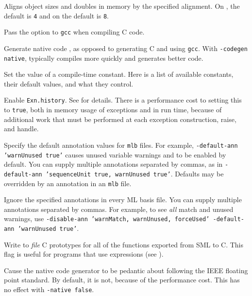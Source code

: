 \begin{description}

Aligns object sizes and doubles in memory by the specified alignment.
On {\intel}, the default is {\tt 4} and on {\sparc} the default is
{\tt 8}.

Pass the option to {\tt gcc} when compiling C code.

Generate native code , as opposed to generating C and using {\tt gcc}.
With {\tt -codegen native}, {\mlton} typically compiles more quickly and
generates better code.

Set the value of a compile-time constant.  Here is a list of available
constants, their default values, and what they control.

\vspace{0em} %
\begin{description}

Enable {\tt Exn.history}.  See  for details.  There is a
performance cost to setting this to {\tt true}, both in memory usage
of exceptions and in run time, because of additional work that must be
performed at each exception construction, raise, and handle.

\end{description}

Specify the default annotation values for {\tt mlb} files.  For
example, {\tt -default-ann 'warnUnused true'} causes unused variable
warnings and to be enabled by default.  You can supply multiple
annotations separated by commas, as in {\tt -default-ann 'sequenceUnit
true, warnUnused true'}.  Defaults may be overridden by an annotation
in an {\tt mlb} file.

Ignore the specified annotations in every ML basis file.  You can
supply multiple annotations separated by commas.  For example, to see
{\em all} match and unused warnings, use {\tt -disable-ann 'warnMatch,
warnUnused, forceUsed' -default-ann 'warnUnused true'}.

Write to {\it file} C prototypes for all of the functions exported
from SML to C.  This flag is useful for programs that use {\export}
expressions (see ).

Cause the native code generator to be pedantic about following the
IEEE floating point standard.  By default, it is not, because of the
performance cost.  This has no effect with {\tt -native false}.


\end{description}
